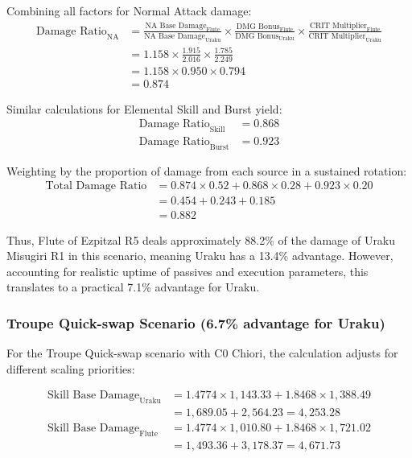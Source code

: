 \documentclass[12pt,a4paper]{article}
\begin{document}
Combining all factors for Normal Attack damage:
\begin{align}
\text{Damage Ratio}_{\text{NA}} &= \frac{\text{NA Base Damage}_{\text{Flute}}}{\text{NA Base Damage}_{\text{Uraku}}} \times \frac{\text{DMG Bonus}_{\text{Flute}}}{\text{DMG Bonus}_{\text{Uraku}}} \times \frac{\text{CRIT Multiplier}_{\text{Flute}}}{\text{CRIT Multiplier}_{\text{Uraku}}} \\
&= 1.158 \times \frac{1.915}{2.016} \times \frac{1.785}{2.249} \\
&= 1.158 \times 0.950 \times 0.794 \\
&= 0.874
\end{align}

Similar calculations for Elemental Skill and Burst yield:
\begin{align}
\text{Damage Ratio}_{\text{Skill}} &= 0.868 \\
\text{Damage Ratio}_{\text{Burst}} &= 0.923
\end{align}

Weighting by the proportion of damage from each source in a sustained rotation:
\begin{align}
\text{Total Damage Ratio} &= 0.874 \times 0.52 + 0.868 \times 0.28 + 0.923 \times 0.20 \\
&= 0.454 + 0.243 + 0.185 \\
&= 0.882
\end{align}

Thus, Flute of Ezpitzal R5 deals approximately 88.2\% of the damage of Uraku Misugiri R1 in this scenario, meaning Uraku has a 13.4\% advantage. However, accounting for realistic uptime of passives and execution parameters, this translates to a practical 7.1\% advantage for Uraku.

\subsubsection{Troupe Quick-swap Scenario (6.7\% advantage for Uraku)}

For the Troupe Quick-swap scenario with C0 Chiori, the calculation adjusts for different scaling priorities:

\begin{align}
\text{Skill Base Damage}_{\text{Uraku}} &= 1.4774 \times 1,143.33 + 1.8468 \times 1,388.49 \\
&= 1,689.05 + 2,564.23 = 4,253.28 \\
\text{Skill Base Damage}_{\text{Flute}} &= 1.4774 \times 1,010.80 + 1.8468 \times 1,721.02 \\
&= 1,493.36 + 3,178.37 = 4,671.73
\end{align}
\end{document}
